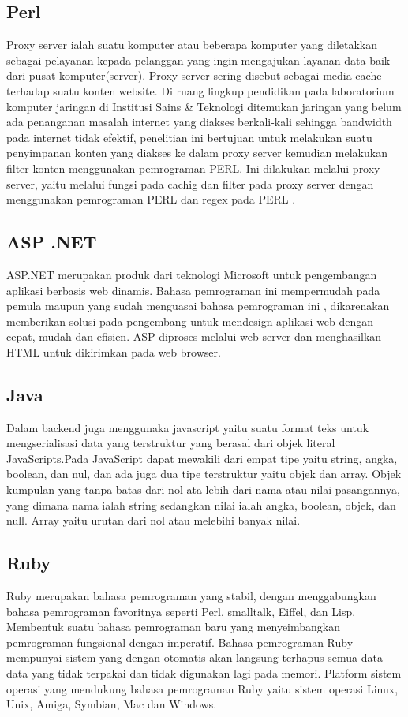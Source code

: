 \subsection{Perl}
	Proxy server ialah suatu komputer atau beberapa komputer yang diletakkan sebagai pelayanan kepada pelanggan yang ingin mengajukan layanan data baik dari pusat komputer(server).
Proxy server sering disebut sebagai media cache terhadap suatu konten website. Di ruang lingkup pendidikan pada laboratorium komputer jaringan di Institusi Sains \& Teknologi ditemukan jaringan yang belum ada penanganan masalah internet yang diakses berkali-kali sehingga bandwidth pada internet tidak efektif, penelitian ini bertujuan  untuk melakukan suatu penyimpanan konten yang diakses ke dalam proxy server kemudian melakukan filter konten menggunakan pemrograman PERL.
Ini dilakukan melalui proxy server, yaitu melalui fungsi pada cachig dan filter pada proxy server dengan menggunakan pemrograman PERL dan regex pada PERL
\cite{pamungkas2017implementasi}.

\subsection{ASP .NET}
	ASP.NET merupakan produk dari teknologi Microsoft untuk pengembangan aplikasi berbasis web dinamis. 
Bahasa pemrograman ini mempermudah pada pemula maupun yang sudah menguasai bahasa pemrograman ini , dikarenakan memberikan solusi pada pengembang untuk mendesign aplikasi web dengan cepat, mudah dan efisien. 
ASP diproses melalui web server dan menghasilkan HTML untuk dikirimkan pada web browser.


\subsection{Java}
	Dalam backend juga menggunaka javascript yaitu suatu format teks untuk mengserialisasi data yang terstruktur yang berasal dari objek literal JavaScripts.Pada JavaScript dapat mewakili dari empat tipe yaitu string, angka, boolean, dan nul, dan ada juga dua tipe terstruktur yaitu objek dan array. Objek kumpulan yang tanpa batas dari nol ata lebih dari nama atau nilai pasangannya, yang dimana nama ialah string sedangkan nilai ialah angka, boolean, objek, dan null. Array yaitu urutan dari nol atau melebihi banyak nilai.

\subsection{Ruby}
	Ruby merupakan bahasa pemrograman yang stabil, dengan menggabungkan bahasa pemrograman favoritnya seperti Perl, smalltalk, Eiffel, dan Lisp.
Membentuk suatu bahasa pemrograman baru yang menyeimbangkan pemrograman fungsional dengan imperatif.
Bahasa pemrograman Ruby mempunyai sistem yang dengan otomatis akan langsung terhapus semua data-data yang tidak terpakai dan tidak digunakan lagi pada memori. 
Platform sistem operasi yang mendukung bahasa pemrograman Ruby yaitu sistem operasi Linux, Unix, Amiga, Symbian, Mac dan Windows.

